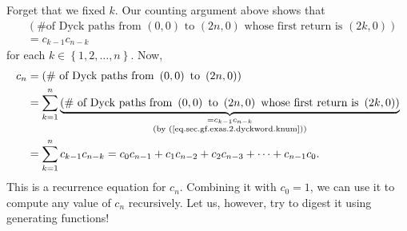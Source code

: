Forget that we fixed $k$. Our counting argument above shows that%
\begin{align}
&  \left(  \text{\# of Dyck paths from }\left(  0,0\right)  \text{ to }\left(
2n,0\right)  \text{ whose first return is }\left(  2k,0\right)  \right)
\nonumber\\
&  =c_{k-1}c_{n-k} \label{eq.sec.gf.exas.2.dyckword.knum}%
\end{align}
for each $k\in\left\{  1,2,\ldots,n\right\}  $. Now,
\begin{align*}
c_{n}  &  =\left(  \text{\# of Dyck paths from }\left(  0,0\right)  \text{ to
}\left(  2n,0\right)  \right) \\
&  =\sum_{k=1}^{n}\underbrace{\left(  \text{\# of Dyck paths from }\left(
0,0\right)  \text{ to }\left(  2n,0\right)  \text{ whose first return is
}\left(  2k,0\right)  \right)  }_{\substack{=c_{k-1}c_{n-k}\\\text{(by
(\ref{eq.sec.gf.exas.2.dyckword.knum}))}}}\\
&  =\sum_{k=1}^{n}c_{k-1}c_{n-k}=c_{0}c_{n-1}+c_{1}c_{n-2}+c_{2}c_{n-3}%
+\cdots+c_{n-1}c_{0}.
\end{align*}
This is a recurrence equation for $c_{n}$. Combining it with $c_{0}=1$, we can
use it to compute any value of $c_{n}$ recursively. Let us, however, try to
digest it using generating functions!

